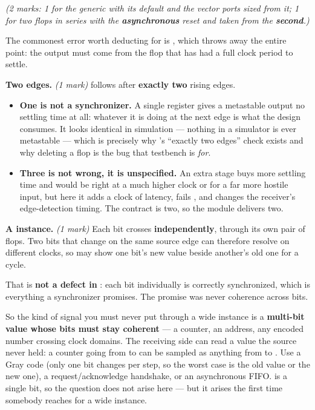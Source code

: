 {\itshape (2 marks: 1 for the generic with its default and the vector ports sized from it; 1 for two
flops in series with the \textbf{asynchronous} reset and  taken from the
\textbf{second}.)\par}

\medskip
The commonest error worth deducting for is , which throws away the entire
point: the output must come from the flop that has had a full clock period to settle.

\textbf{Two edges.} \textit{(1 mark)}  follows  after \textbf{exactly
two} rising edges.
\begin{itemize}
  \item \textbf{One is not a synchronizer.} A single register gives a metastable output no settling
    time at all: whatever it is doing at the next edge is what the design consumes. It looks
    identical in simulation --- nothing in a simulator is ever metastable --- which is precisely why
    's ``exactly two edges'' check exists and why deleting a flop is the bug that
    testbench is \emph{for}.
  \item \textbf{Three is not wrong, it is unspecified.} An extra stage buys more settling time and
    would be right at a much higher clock or for a far more hostile input, but here it adds a clock
    of latency, fails , and changes the receiver's edge-detection timing. The contract
    is two, so the module delivers two.
\end{itemize}

\textbf{A  instance.} \textit{(1 mark)} Each bit crosses \textbf{independently},
through its own pair of flops. Two bits that change on the same source edge can therefore resolve on
different clocks, so  may show one bit's new value beside another's old one for a
cycle.

That is \textbf{not a defect in }: each bit individually is correctly synchronized, which
is everything a synchronizer promises. The promise was never coherence across bits.

So the kind of signal you must never put through a wide instance is a \textbf{multi-bit value whose
bits must stay coherent} --- a counter, an address, any encoded number crossing clock domains. The
receiving side can read a value the source never held: a counter going from  to
 can be sampled as anything from  to . Use a Gray code (only one bit
changes per step, so the worst case is the old value or the new one), a request/acknowledge
handshake, or an asynchronous FIFO.  is a single bit, so the question does not arise here
--- but it arises the first time somebody reaches for a wide instance.

